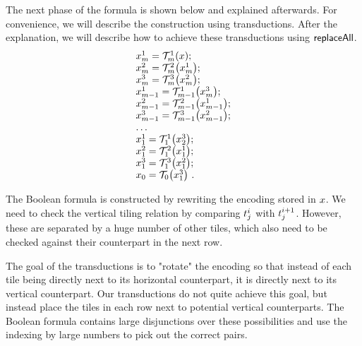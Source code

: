 The next phase of the formula is shown below and explained afterwards.
For convenience, we will describe the construction using transductions.
After the explanation, we will describe how to achieve these transductions
using $\mathsf{replaceAll}$.
\[
    \begin{array}{l}
        x^1_m = {\mathcal{T}^1_m}\mathord{\left(x\right)}; \\
        x^2_m = {\mathcal{T}^2_m}\mathord{\left(x^1_m\right)}; \\
        x^3_m = {\mathcal{T}^3_m}\mathord{\left(x^2_m\right)}; \\
        x^1_{m-1}
            = {\mathcal{T}^1_{m-1}}\mathord{\left(x^3_m\right)}; \\
        x^2_{m-1}
            = {\mathcal{T}^2_{m-1}}\mathord{\left(x^1_{m-1}\right)}; \\
        x^3_{m-1}
            = {\mathcal{T}^3_{m-1}}\mathord{\left(x^2_{m-1}\right)}; \\
        \ldots \\
        x^1_1 = {\mathcal{T}^1_1}\mathord{\left(x^3_2\right)}; \\
        x^2_1 = {\mathcal{T}^2_1}\mathord{\left(x^1_1\right)}; \\
        x^3_1 = {\mathcal{T}^3_1}\mathord{\left(x^2_1\right)}; \\
        x_0 = {\mathcal{T}_0}\mathord{\left(x^3_1\right)} \ .
    \end{array}
\]

The Boolean formula is constructed by rewriting the encoding stored in
$x$. We need to check the vertical tiling relation by comparing
$t^i_j$ with $t^{i+1}_j$. However, these are
separated by a huge number of other tiles, which also need to be checked
against their counterpart in the next row.

The goal of the transductions is to "rotate" the encoding so that
instead of each tile being directly next to its horizontal counterpart,
it is directly next to its vertical counterpart. Our transductions do
not quite achieve this goal, but instead place the tiles in each row next to
potential vertical counterparts. The Boolean formula contains large
disjunctions over these possibilities and use the indexing by large
numbers to pick out the correct pairs.

